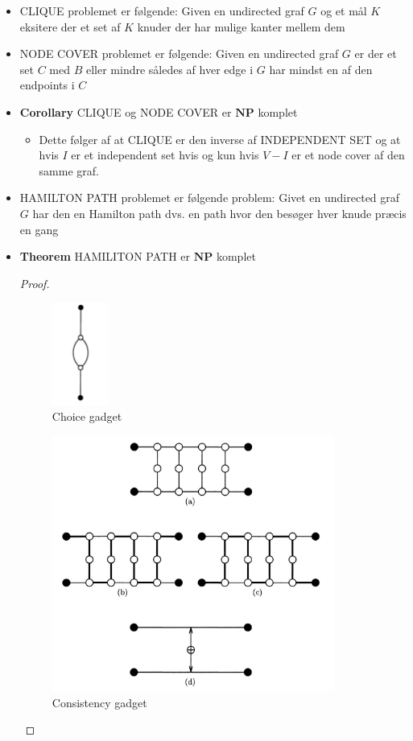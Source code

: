 \begin{itemize}
\begin{proof}
  \end{proof}
  \item CLIQUE problemet er følgende: Given en undirected graf $G$ og et mål $K$ eksitere der et set af $K$ knuder der har mulige kanter mellem dem
  \item NODE COVER problemet er følgende: Given en undirected graf $G$ er der et set $C$ med $B$ eller mindre således af hver edge i $G$ har mindst en af den endpoints i $C$ 
  \item \textbf{Corollary} CLIQUE og NODE COVER er $\mathbf{NP}$ komplet 
  \begin{itemize}
  	\item Dette følger af at CLIQUE er den inverse af INDEPENDENT SET og at hvis $I$ er et independent set hvis og kun hvis $V-I$ er et node cover af den samme graf.
  \end{itemize}
  \item HAMILTON PATH problemet er følgende problem: Givet en undirected graf $G$ har den en Hamilton path dvs. en path hvor den besøger hver knude præcis en gang
  \item \textbf{Theorem} HAMILITON PATH er $\mathbf{NP}$ komplet
  \begin{proof} 
  \begin{figure}[ht]
  	\centering
  	\includegraphics[width=70px]{img/choice_gadget}
  	\caption{Choice gadget\label{fig:choice}}
  \end{figure}

  \begin{figure}[ht]
  	\centering
  	\includegraphics[width=350px]{img/consistency_gadget}
  	\caption{Consistency gadget\label{fig:consistency}}
  \end{figure}


\end{proof}
\end{itemize}
